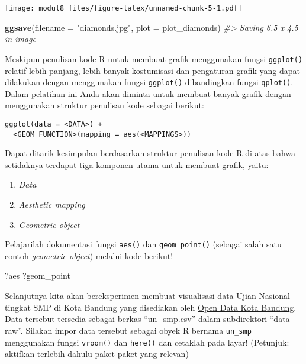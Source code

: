 \documentclass[
]{article}
\newenvironment{Shaded}{\begin{snugshade}}{\end{snugshade}}
\newcommand{\CommentTok}[1]{\textcolor[rgb]{0.56,0.35,0.01}{\textit{#1}}}
\newcommand{\DataTypeTok}[1]{\textcolor[rgb]{0.13,0.29,0.53}{#1}}
\newcommand{\KeywordTok}[1]{\textcolor[rgb]{0.13,0.29,0.53}{\textbf{#1}}}
\newcommand{\NormalTok}[1]{#1}
\newcommand{\StringTok}[1]{\textcolor[rgb]{0.31,0.60,0.02}{#1}}
\providecommand{\tightlist}{%
  \setlength{\itemsep}{0pt}\setlength{\parskip}{0pt}}
\begin{document}
\texttt{[image: modul8\_files/figure-latex/unnamed-chunk-5-1.pdf]}

\begin{Shaded}
\begin{Highlighting}[]

\KeywordTok{ggsave}\NormalTok{(}\DataTypeTok{filename =} \StringTok{"diamonds.jpg"}\NormalTok{, }\DataTypeTok{plot =}\NormalTok{ plot_diamonds)}
\CommentTok{#> Saving 6.5 x 4.5 in image}
\end{Highlighting}
\end{Shaded}

Meskipun penulisan kode R untuk membuat grafik menggunakan fungsi
\texttt{ggplot()} relatif lebih panjang, lebih banyak kostumisasi dan
pengaturan grafik yang dapat dilakukan dengan menggunakan fungsi
\texttt{ggplot()} dibandingkan fungsi \texttt{qplot()}. Dalam pelatihan
ini Anda akan diminta untuk membuat banyak grafik dengan menggunakan
struktur penulisan kode sebagai berikut:

\begin{verbatim}
ggplot(data = <DATA>) +
  <GEOM_FUNCTION>(mapping = aes(<MAPPINGS>))
\end{verbatim}

Dapat ditarik kesimpulan berdasarkan struktur penulisan kode R di atas
bahwa setidaknya terdapat tiga komponen utama untuk membuat grafik,
yaitu:

\begin{enumerate}
\def\labelenumi{\arabic{enumi}.}
\tightlist
\item
  \emph{Data}
\item
  \emph{Aesthetic mapping}
\item
  \emph{Geometric object}
\end{enumerate}

Pelajarilah dokumentasi fungsi \texttt{aes()} dan \texttt{geom\_point()}
(sebagai salah satu contoh \emph{geometric object}) melalui kode
berikut!

\begin{Shaded}
\begin{Highlighting}[]
\NormalTok{?aes}
\NormalTok{?geom_point}
\end{Highlighting}
\end{Shaded}

Selanjutnya kita akan bereksperimen membuat visualisasi data Ujian
Nasional tingkat SMP di Kota Bandung yang disediakan oleh
\href{http://data.bandung.go.id}{Open Data Kota Bandung}. Data tersebut
tersedia sebagai berkas ``un\_smp.csv'' dalam subdirektori ``data-raw''.
Silakan impor data tersebut sebagai obyek R bernama \texttt{un\_smp}
menggunakan fungsi \texttt{vroom()} dan \texttt{here()} dan cetaklah
pada layar! (Petunjuk: aktifkan terlebih dahulu paket-paket yang
relevan)
\end{document}
